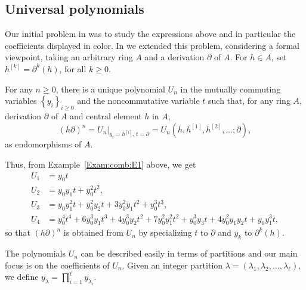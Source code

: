 \documentclass{commat}
\newcommand{\eval}[2]{\left. #1 \right|_{#2}}
\newcommand{\pb}[1]{\left\{ #1\right\}}
\begin{document}
\subsection{Universal polynomials}\label{S:comb:universal}

Our initial problem in \cite[Sec.\ 8]{BLO13} was to study the expressions above and in particular the coefficients displayed in color. In \cite{BLR20} we extended this problem, considering a formal viewpoint, taking an arbitrary ring $A$ and a derivation $\partial$ of $A$. For $h\in A$, set $h^{[k]}=\partial^k(h)$, for all $k\geq 0$.

\begin{theorem}\label{T:univpolys:univprop}
	For any $n\geq 0$, there is a unique polynomial $U_n$ in the mutually commuting variables $\pb{y_i}_{i\geq 0}$ and the noncommutative variable $t$ such that, for any ring $A$, derivation $\partial$ of $A$ and central element $h$ in $A$,
	\begin{equation*}
		\left(h\partial\right)^n 
		= \eval{U_n}{y_i=h^{[i]},\, t=\partial}=U_n(h, h^{[1]}, h^{[2]}, \ldots; \partial),
	\end{equation*}
	as endomorphisms of $A$.
\end{theorem}

Thus, from Example~\ref{Exam:comb:E1} above, we get 
\begin{align*}
	U_1 & =y_0  t\\
	U_2 & = y_0 y_1 t + y_0^2 t^2,\\
	U_3 & = y_0 y_1^2 t + y_0^2 y_2 t  + 3 y_0^2 y_1 t^2 + y_0^3 t^3, \\
	U_4&=y_0^4t^4+6y_0^3y_1t^3+4y_0^3y_2t^2+7y_0^2y_1^2t^2+y_0^3y_3t+4y_0^2y_1y_2t+y_0y_1^3t,
\end{align*}
so that $(h \partial)^n$ is obtained from $U_n$ by specializing $t$ to $\partial$ and $y_k$ to $\partial^k (h)$.

The polynomials $U_n$ can be described easily in terms of partitions and our main focus is on the coefficients of $U_n$. Given an integer partition $\lambda=(\lambda_1,\lambda_2,\ldots,\lambda_\ell)$, we define $y_{\lambda}=\prod_{i=1}^\ell y_{\lambda_i}$.
\end{document}
